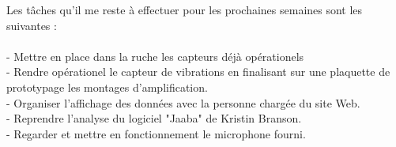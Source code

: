 \documentclass[11pt,french,a4paper]{article}
\begin{document}
Les tâches qu'il me reste à effectuer pour les prochaines semaines sont les suivantes :
\\
\\- Mettre en place dans la ruche les capteurs déjà opérationels
\\- Rendre opérationel le capteur de vibrations en finalisant sur une plaquette de prototypage les montages d'amplification.
\\- Organiser l'affichage des données avec la personne chargée du site Web. 
\\- Reprendre l'analyse du logiciel "Jaaba" de  Kristin Branson. 
\\- Regarder et mettre en fonctionnement le microphone fourni.
\newpage
\listoffigures
\end{document}

